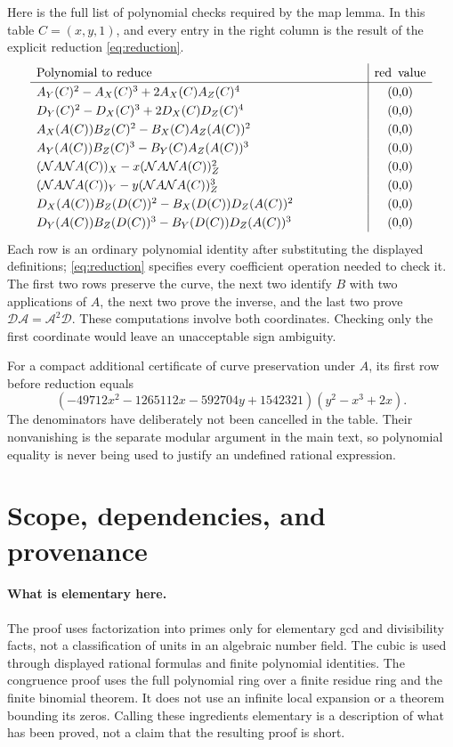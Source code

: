 \documentclass[11pt,a4paper]{article}
\theoremstyle{definition}
\newcommand{\NN}{\mathcal N}
\renewcommand{\AA}{\mathcal A}
\newcommand{\DD}{\mathcal D}
\newcommand{\red}{\operatorname{red}}
\begin{document}
Here is the full list of polynomial checks required by the map lemma.
In this table \(C=(x,y,1)\), and every entry in the right column
is the result of the explicit reduction \eqref{eq:reduction}.
\[
\renewcommand{\arraystretch}{1.25}
\begin{array}{p{0.76\linewidth}|c}
\text{Polynomial to reduce}&\red\text{ value}\\\hline
 $A_Y(C)^2-A_X(C)^3+2A_X(C)A_Z(C)^4$ & $(0,0)$\\
 $D_Y(C)^2-D_X(C)^3+2D_X(C)D_Z(C)^4$ & $(0,0)$\\
 $A_X(A(C))B_Z(C)^2-B_X(C)A_Z(A(C))^2$ & $(0,0)$\\
 $A_Y(A(C))B_Z(C)^3-B_Y(C)A_Z(A(C))^3$ & $(0,0)$\\
 $(\NN A\NN A(C))_X-x(\NN A\NN A(C))_Z^2$ & $(0,0)$\\
 $(\NN A\NN A(C))_Y-y(\NN A\NN A(C))_Z^3$ & $(0,0)$\\
 $D_X(A(C))B_Z(D(C))^2-B_X(D(C))D_Z(A(C))^2$ & $(0,0)$\\
 $D_Y(A(C))B_Z(D(C))^3-B_Y(D(C))D_Z(A(C))^3$ & $(0,0)$
\end{array}
\]
Each row is an ordinary polynomial identity after substituting the
displayed definitions; \eqref{eq:reduction} specifies every coefficient
operation needed to check it. The first two rows preserve the curve,
the next two identify \(B\) with two applications of \(A\), the next
two prove the inverse, and the last two prove \(\DD\AA=\AA^2\DD\).
These computations involve both coordinates. Checking only the first
coordinate would leave an unacceptable sign ambiguity.

For a compact additional certificate of curve preservation under
\(A\), its first row before reduction equals
\[
 (-49712x^2-1265112x-592704y+1542321)(y^2-x^3+2x).
\]
The denominators have deliberately not been cancelled in the table.
Their nonvanishing is the separate modular argument in the main text,
so polynomial equality is never being used to justify an undefined
rational expression.

\section{Scope, dependencies, and provenance}\label{app:scope}

\paragraph{What is elementary here.}
The proof uses factorization into primes only for elementary gcd and
divisibility facts, not a classification of units in an algebraic
number field. The cubic is used through displayed rational formulas
and finite polynomial identities. The congruence proof uses the full
polynomial ring over a finite residue ring and the finite binomial
theorem. It does not use an infinite local expansion or a theorem
bounding its zeros. Calling these ingredients elementary is a
description of what has been proved, not a claim that the resulting
proof is short.
\end{document}

